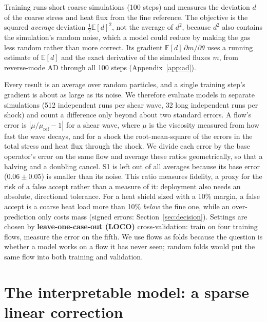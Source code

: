 \documentclass[10pt]{article}
\begin{document}
Training runs short coarse simulations (100 steps) and measures the deviation $d$ of the coarse
stress and heat flux from the fine reference. The objective is the squared
\emph{average} deviation $\tfrac12\mathbb E[d]^2$, not the average of $d^2$, because $d^2$ also
contains the simulation's random noise, which a model could reduce by making the gas less random
rather than more correct. Its gradient $\mathbb E[d]\,\partial m/\partial\theta$ uses a running
estimate of $\mathbb E[d]$ and the exact derivative of the simulated fluxes $m$, from
reverse-mode AD through all 100 steps (Appendix~\ref{app:ad}).

Every result is an average over random particles, and a single training step's gradient is
about as large as its noise. We therefore evaluate models in separate simulations (512 independent runs per shear wave, 32
long independent runs per shock) and count a difference only beyond about two standard errors. A flow's
error is $|\mu/\mu_\mathrm{ref}-1|$ for a shear wave, where $\mu$ is the viscosity measured from
how fast the wave decays, and for a shock the root-mean-square of the errors in the total stress
and heat flux through the shock. We divide each error by the base operator's error on the same
flow and average these ratios geometrically, so that a halving and a doubling cancel. S1 is left
out of all averages because its base error ($0.06\pm0.05$) is smaller than its noise. This ratio measures fidelity, a proxy for the risk of a false accept rather than a measure of
it: deployment also needs an absolute, directional tolerance. For a heat shield sized with a 10\%
margin, a false accept is a coarse heat load more than 10\% \emph{below} the fine one, while an
over-prediction only costs mass (signed errors: Section~\ref{sec:decision}). Settings are chosen by \textbf{leave-one-case-out (LOCO)} cross-validation: train on four
training flows, measure the error on the fifth. We use flows as folds because the question is
whether a model works on a flow it has never seen; random folds would put the same flow into
both training and validation.

\section{The interpretable model: a sparse linear correction}
\end{document}

